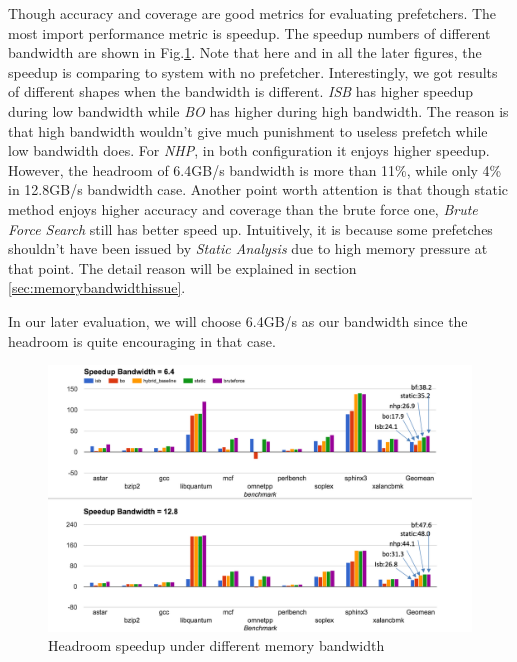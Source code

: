   Though accuracy and coverage are good metrics for evaluating prefetchers. The most import performance metric is speedup. The speedup numbers of different bandwidth are shown in Fig.\ref{fig:headroom_speedup}. Note that here and in all the later figures, the speedup is comparing to system with no prefetcher. Interestingly, we got results of different shapes when the bandwidth is different. \emph{ISB} has higher speedup during low bandwidth while \emph{BO} has higher during high bandwidth. The reason is that high bandwidth wouldn't give much punishment to useless prefetch while low bandwidth does. For \emph{NHP}, in both configuration it enjoys higher speedup. However, the headroom of 6.4GB/s bandwidth is more than 11\%, while only 4\% in 12.8GB/s bandwidth case. Another point worth attention is that though static method enjoys higher accuracy and coverage than the brute force one, \emph{Brute Force Search} still has better speed up. Intuitively, it is because some prefetches shouldn't have been issued by \emph{Static Analysis} due to high memory pressure at that point. The detail reason will be explained in section \ref{sec:memorybandwidthissue}.

  In our later evaluation, we will choose 6.4GB/s as our bandwidth since the headroom is quite encouraging in that case.


  \begin{figure}[ht!]
	   \centering
	   \includegraphics[width=1.0\textwidth]{images/headroom_speedup.png}
	   \caption{Headroom speedup under different memory bandwidth}
	  \label{fig:headroom_speedup}
  \end{figure}

